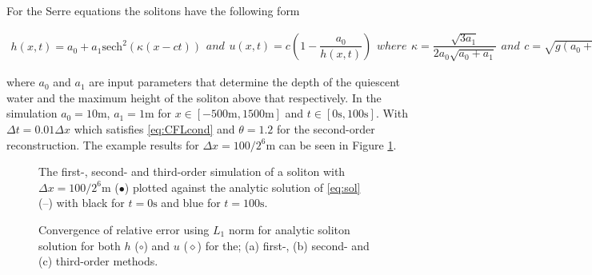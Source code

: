 \documentclass[SingleSpace,12pt,Proceedings]{Serre_ASCE}
\begin{document}
For the Serre equations the solitons have the following form
\begin{linenomath}
\begin{subequations}
\begin{gather}
h\left(x,t\right) = a_0 + a_1\text{sech}^2\left( \kappa\left(x - ct\right)\right)
\end{gather}
and
\begin{gather}
u\left(x,t\right) = c\left(1 - \dfrac{a_0}{h(x,t)} \right)
\end{gather}
where
\begin{gather}
\kappa = \dfrac{\sqrt{3a_1}}{2a_0 \sqrt{ a_0 + a_1}}
\end{gather}
and
\begin{gather}
c = \sqrt{g \left(a_0 + a_1\right)}
\end{gather}
\label{eq:sol}
\end{subequations}
\end{linenomath}
where $a_0$ and $a_1$ are input parameters that determine the depth of the quiescent water and the maximum height of the soliton above that respectively. In the simulation $a_0 = 10\text{m}$, $a_1 = 1\text{m}$ for $x\in\left[-500\text{m},1500\text{m}\right]$ and $t\in\left[0\text{s},100\text{s}\right]$. With $\Delta t = 0.01 \Delta x$ which satisfies \eqref{eq:CFLcond} and $\theta = 1.2$ for the second-order reconstruction. The example results for $\Delta x = 100 /2^{6}\text{m}$ can be seen in Figure \ref{fig:solitone}.

\subfiglabelskip=0pt
\begin{figure}
\centering
{}
\caption{The first-, second- and third-order simulation of a soliton with $\Delta x = 100 /2^{6}\text{m}$ ($\bullet$) plotted against the analytic solution of \eqref{eq:sol} (\---) with black for $t =0\text{s}$ and blue for $t=100\text{s}$.}
\label{fig:solitone}
\end{figure}
\begin{figure}
\centering
{}
\caption{Convergence of relative error using $L_1$ norm for analytic soliton solution for both $h$ ($\circ$) and $u$ ($\diamond$) for the; (a) first-, (b) second- and (c) third-order methods.}
\label{fig:solitoncon}
\end{figure} 
\end{document}
